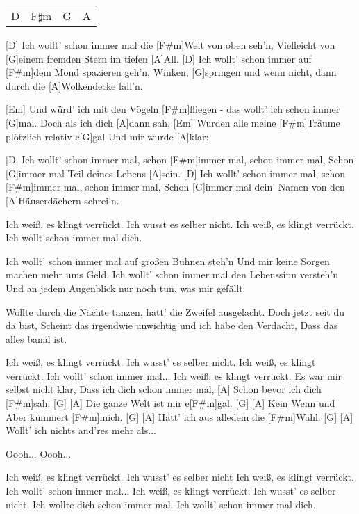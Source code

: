 

\begin{guitar}
	{\footnotesize\begin{tabular}{l|l|l|l}
			D & F$\sharp$m & G & A	
	\end{tabular}}
	
	[D] Ich wollt' schon immer mal die [F#m]Welt von oben seh'n,
	Vielleicht von [G]einem fremden Stern im tiefen [A]All.
	[D] Ich wollt' schon immer auf [F#m]dem Mond spazieren geh'n,
	Winken, [G]springen und wenn nicht, dann durch die [A]Wolkendecke fall'n.
	
	[Em] Und würd' ich mit den Vögeln [F#m]fliegen - das wollt' ich schon immer [G]mal.
	Doch als ich dich [A]dann sah,
	[Em] Wurden alle meine [F#m]Träume plötzlich relativ e[G]gal
	Und mir wurde [A]klar:
	
	[D] Ich wollt' schon immer mal, schon [F#m]immer mal, schon immer mal,
	Schon [G]immer mal Teil deines Lebens [A]sein.
	[D] Ich wollt' schon immer mal, schon [F#m]immer mal, schon immer mal,
	Schon [G]immer mal dein' Namen von den [A]Häuserdächern schrei'n.
	
	Ich weiß, es klingt verrückt. Ich wusst es selber nicht.
	Ich weiß, es klingt verrückt. Ich wollt schon immer mal dich.
	
	Ich wollt' schon immer mal auf großen Bühnen steh'n
	Und mir keine Sorgen machen mehr ums Geld.
	Ich wollt' schon immer mal den Lebenssinn versteh'n
	Und an jedem Augenblick nur noch tun, was mir gefällt.
	
	\pagebreak
	
	Wollte durch die Nächte tanzen, hätt' die Zweifel ausgelacht.
	Doch jetzt seit du da bist,
	Scheint das irgendwie unwichtig und ich habe den Verdacht,
	Dass das alles banal ist.
	
	 
	
	Ich weiß, es klingt verrückt. Ich wusst' es selber nicht.
	Ich weiß, es klingt verrückt. Ich wollt' schon immer mal...
	Ich weiß, es klingt verrückt. Es war mir selbst nicht klar,
	Dass ich dich schon immer mal,
	[A] Schon bevor ich dich [F#m]sah. [G]{}
	[A] Die ganze Welt ist mir e[F#m]gal. [G]{}
	[A] Kein Wenn und Aber kümmert [F#m]mich. [G]{}
	[A] Hätt' ich aus alledem die [F#m]Wahl. [G]{}
	[A] Wollt' ich nichts and'res mehr als...
	
	Oooh...
	Oooh...
	
	 
	
	Ich weiß, es klingt verrückt. Ich wusst' es selber nicht
	Ich weiß, es klingt verrückt. Ich wollt' schon immer mal...
	Ich weiß, es klingt verrückt. Ich wusst' es selber nicht.
	Ich wollte dich schon immer mal. Ich wollt' schon immer mal dich.
\end{guitar}

